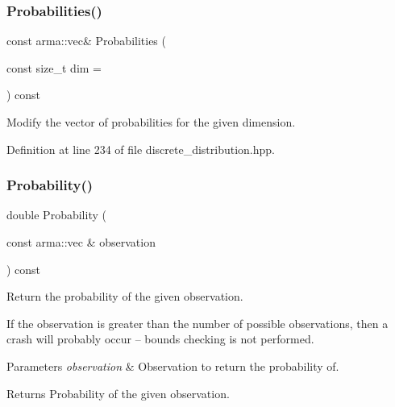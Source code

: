 \subsubsection{Probabilities()\hspace{0.1cm}{\footnotesize\ttfamily [2/2]}}
{\footnotesize\ttfamily const arma\+::vec\& Probabilities (\begin{DoxyParamCaption}\item[{const size\+\_\+t}]{dim = {} }\end{DoxyParamCaption}) const\hspace{0.3cm}{\ttfamily [inline]}}



Modify the vector of probabilities for the given dimension. 



Definition at line 234 of file discrete\+\_\+distribution.\+hpp.

\mbox{\label{classmlpack_1_1distribution_1_1DiscreteDistribution_ab72935d592516e77511d0b5e703c0d41}} 
\subsubsection{Probability()\hspace{0.1cm}{\footnotesize\ttfamily [1/2]}}
{\footnotesize\ttfamily double Probability (\begin{DoxyParamCaption}\item[{const arma\+::vec \&}]{observation }\end{DoxyParamCaption}) const\hspace{0.3cm}{\ttfamily [inline]}}



Return the probability of the given observation. 

If the observation is greater than the number of possible observations, then a crash will probably occur -- bounds checking is not performed.


\begin{DoxyParams}{Parameters}
{\em observation} & Observation to return the probability of. \\
\hline
\end{DoxyParams}
\begin{DoxyReturn}{Returns}
Probability of the given observation. 
\end{DoxyReturn}


